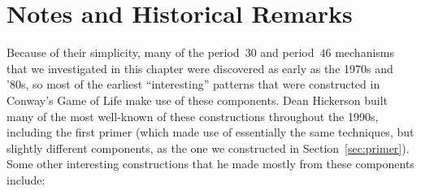\section{Notes and Historical Remarks}\label{sec:periodic_circuits_notes}

Because of their simplicity, many of the period~$30$ and period~$46$ mechanisms that we investigated in this chapter were discovered as early as the 1970s and '80s, so most of the earliest ``interesting'' patterns that were constructed in Conway's Game of Life make use of these components. Dean Hickerson built many of the most well-known of these constructions throughout the 1990s, including the first primer (which made use of essentially the same techniques, but slightly different components, as the one we constructed in Section~\ref{sec:primer}). Some other interesting constructions that he made mostly from these components include:\smallskip

